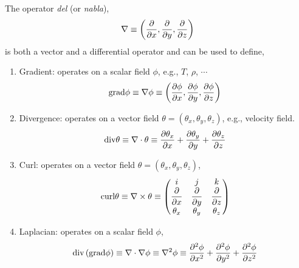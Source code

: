 The operator {\it del} (or {\it nabla}),\index{$\nabla$}
\begin{displaymath}
  \nabla \equiv \left(\displaystyle\frac{\partial}{\partial x}, \frac{\partial}{\partial y}, \frac{\partial}{\partial z}\right)
\end{displaymath} 
is both a vector and a differential operator and can be used to define,
\begin{enumerate}
%
  \item Gradient: operates on a scalar field $\phi$, e.g., $T$, $\rho$, $\cdots$
     \begin{displaymath}
        \text{grad}\phi \equiv \nabla\phi \equiv \left(\displaystyle\frac{\partial\phi}{\partial x}, \frac{\partial\phi}{\partial y}, \frac{\partial\phi}{\partial z}\right)
     \end{displaymath}
%
  \item Divergence: operates on a vector field  $\theta = \left(\theta_{x}, \theta_{y}, \theta_{z}\right) $, e.g., velocity field.
     \begin{displaymath}
        \text{div}\theta \equiv \nabla\cdot\theta \equiv \displaystyle\frac{\partial\theta_{x}}{\partial x} + \frac{\partial\theta_{y}}{\partial y} + \frac{\partial\theta_{z}}{\partial z}
     \end{displaymath}
%
  \item Curl: operates on a vector field  $\theta = \left(\theta_{x}, \theta_{y}, \theta_{z}\right)$,
     \begin{displaymath}
        \text{curl}\theta \equiv \nabla\times\theta \equiv \begin{pmatrix} i & j & k \\ \displaystyle\frac{\partial}{\partial x} & \displaystyle\frac{\partial}{\partial y} & \displaystyle\frac{\partial}{\partial z} \\ \theta_{x} & \theta_{y} & \theta_{z} \end{pmatrix}
     \end{displaymath}
%
   \item Laplacian: operates on a scalar field $\phi$,
      \begin{displaymath}
         \text{div}\left(\text{grad}\phi\right) \equiv \nabla\cdot\nabla\phi \equiv \nabla^{2}\phi \equiv \displaystyle\frac{\partial^{2}\phi}{\partial x^{2}} + \displaystyle\frac{\partial^{2}\phi}{\partial y^{2}} + \displaystyle\frac{\partial^{2}\phi}{\partial z^{2}}
      \end{displaymath}
%
\end{enumerate}


